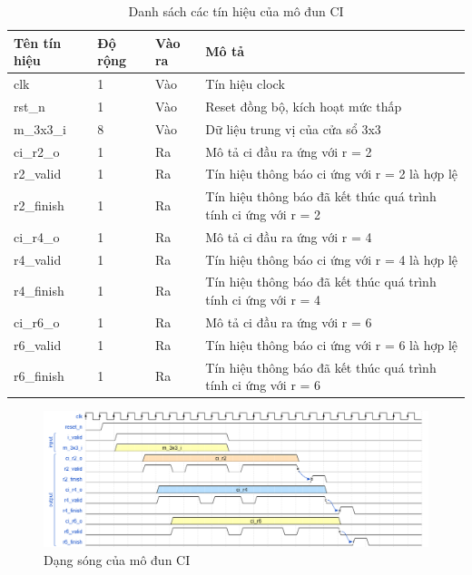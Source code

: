 \begin{table}[!ht]
    \centering
    \renewcommand{\arraystretch}{1.3} %
    \begin{tabular}{|p{3cm} p{2cm} p{2cm} p{8cm}|}
        \hline
        \rowcolor{gray!30}
        \textbf{Tên tín hiệu} & \textbf{Độ rộng} & \textbf{Vào ra} & \textbf{Mô tả} \\
        \hline
        clk & 1 & Vào & Tín hiệu clock \\
        \hline
        rst\_n & 1 & Vào & Reset đồng bộ, kích hoạt mức thấp \\
        \hline 
        m\_3x3\_i & 8 & Vào & Dữ liệu trung vị của cửa sổ 3x3
        \\ \hline
        ci\_r2\_o & 1 & Ra & Mô tả ci đầu ra ứng với r = 2
        \\ \hline
        r2\_valid & 1 & Ra & Tín hiệu thông báo ci ứng với r = 2 là hợp lệ
        \\ \hline
        r2\_finish & 1 & Ra & Tín hiệu thông báo đã kết thúc quá trình tính ci ứng với r = 2
        \\ \hline
                ci\_r4\_o & 1 & Ra & Mô tả ci đầu ra ứng với r = 4
        \\ \hline
        r4\_valid & 1 & Ra & Tín hiệu thông báo ci ứng với r = 4 là hợp lệ
        \\ \hline
        r4\_finish & 1 & Ra & Tín hiệu thông báo đã kết thúc quá trình tính ci ứng với r = 4
        \\ \hline
                ci\_r6\_o & 1 & Ra & Mô tả ci đầu ra ứng với r = 6
        \\ \hline
        r6\_valid & 1 & Ra & Tín hiệu thông báo ci ứng với r = 6 là hợp lệ
        \\ \hline
        r6\_finish & 1 & Ra & Tín hiệu thông báo đã kết thúc quá trình tính ci ứng với r = 6
        \\ \hline
       
    \end{tabular}
    \caption{Danh sách các tín hiệu của mô đun CI}
    \label{tab:signalListCI}
\end{table}

\begin{figure}[!ht]
    \centering
    \includegraphics[width=\linewidth]{figures/ci.png}
    \caption{Dạng sóng của mô đun CI}
    \label{fig:ci}
\end{figure}

